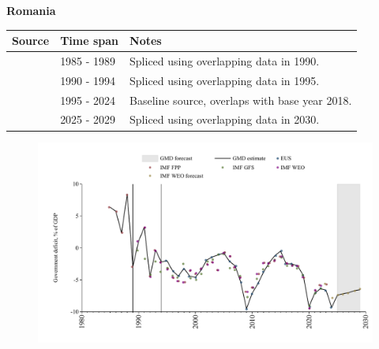 \documentclass[12pt,a4paper,landscape]{article}
\begin{document}
\begin{adjustbox}{max totalsize={\paperwidth}{\paperheight},center}
\begin{minipage}[t][\textheight][t]{\textwidth}
\vspace*{0.5cm}
{}
\begin{center}
{\Large\bfseries Romania}
\end{center}
\vspace{0.5cm}
\begin{table}[H]
\centering
\small
\begin{tabular}{|l|l|l|}
\hline
\textbf{Source} & \textbf{Time span} & \textbf{Notes} \\
\hline
\rowcolor{white}\cite{IMF_FPP}& 1985 - 1989 &Spliced using overlapping data in 1990.\\
\rowcolor{lightgray}\cite{IMF_WEO}& 1990 - 1994 &Spliced using overlapping data in 1995.\\
\rowcolor{white}\cite{EUS}& 1995 - 2024 &Baseline source, overlaps with base year 2018.\\
\rowcolor{lightgray}\cite{IMF_WEO_forecast}& 2025 - 2029 &Spliced using overlapping data in 2030.\\
\hline
\end{tabular}
\end{table}
\begin{figure}[H]
\centering
\includegraphics[width=\textwidth,height=0.6\textheight,keepaspectratio]{graphs/ROU_govdef_GDP.pdf}
\end{figure}
\end{minipage}
\end{adjustbox}
\end{document}
